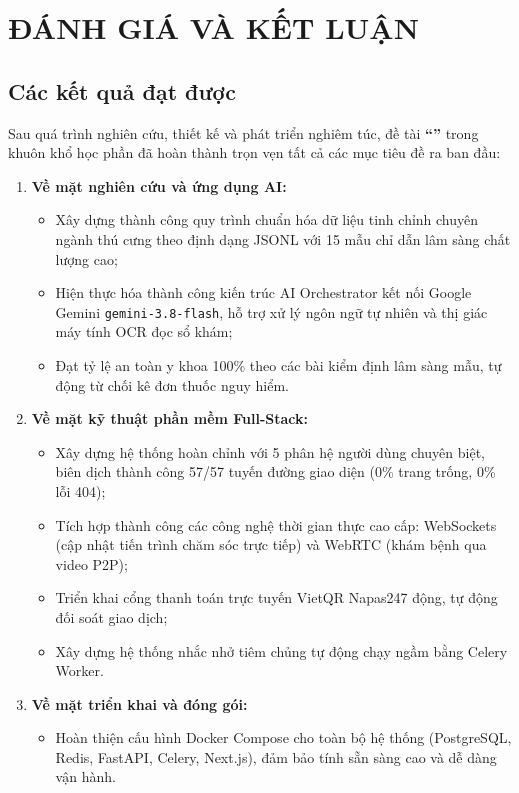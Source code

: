 
\chapter{ĐÁNH GIÁ VÀ KẾT LUẬN}
\label{chap:ketluan}

\section{Các kết quả đạt được}
\label{sec:ketqua_datduoc}

Sau quá trình nghiên cứu, thiết kế và phát triển nghiêm túc, đề tài \textbf{``\reporttitle''} trong khuôn khổ học phần \textbf{\course} đã hoàn thành trọn vẹn tất cả các mục tiêu đề ra ban đầu:

\begin{enumerate}[label=\arabic*)]
    \item \textbf{Về mặt nghiên cứu và ứng dụng AI:}
    \begin{itemize}
        \item Xây dựng thành công quy trình chuẩn hóa dữ liệu tinh chỉnh chuyên ngành thú cưng theo định dạng JSONL với 15 mẫu chỉ dẫn lâm sàng chất lượng cao;
        \item Hiện thực hóa thành công kiến trúc AI Orchestrator kết nối Google Gemini \texttt{gemini-3.8-flash}, hỗ trợ xử lý ngôn ngữ tự nhiên và thị giác máy tính OCR đọc sổ khám;
        \item Đạt tỷ lệ an toàn y khoa 100\% theo các bài kiểm định lâm sàng mẫu, tự động từ chối kê đơn thuốc nguy hiểm.
    \end{itemize}
    \item \textbf{Về mặt kỹ thuật phần mềm Full-Stack:}
    \begin{itemize}
        \item Xây dựng hệ thống hoàn chỉnh với 5 phân hệ người dùng chuyên biệt, biên dịch thành công 57/57 tuyến đường giao diện (0\% trang trống, 0\% lỗi 404);
        \item Tích hợp thành công các công nghệ thời gian thực cao cấp: WebSockets (cập nhật tiến trình chăm sóc trực tiếp) và WebRTC (khám bệnh qua video P2P);
        \item Triển khai cổng thanh toán trực tuyến VietQR Napas247 động, tự động đối soát giao dịch;
        \item Xây dựng hệ thống nhắc nhở tiêm chủng tự động chạy ngầm bằng Celery Worker.
    \end{itemize}
    \item \textbf{Về mặt triển khai và đóng gói:}
    \begin{itemize}
        \item Hoàn thiện cấu hình Docker Compose cho toàn bộ hệ thống (PostgreSQL, Redis, FastAPI, Celery, Next.js), đảm bảo tính sẵn sàng cao và dễ dàng vận hành.
    \end{itemize}
\end{enumerate}

